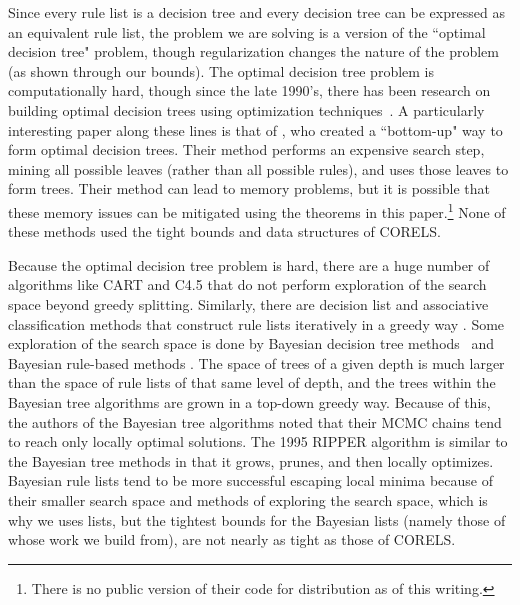 

Since every rule list is a decision tree and every decision tree can be expressed as an equivalent rule list, the problem we are solving is a version of the ``optimal decision tree" problem, though regularization changes the nature of the problem (as shown through our bounds). The optimal decision tree problem is computationally hard, though since the late 1990's, there has been research on building optimal decision trees using optimization techniques~\citep{Bennett96optimaldecision,dobkininduction,FarhangfarGZ08}. A particularly interesting paper along these lines is that of \citet{NijssenFromont2010}, who created a ``bottom-up" way to form optimal decision trees. Their method performs an expensive search step, mining all possible leaves (rather than all possible rules), and uses those leaves to form trees. Their method can lead to memory problems, but it is possible that these memory issues can be mitigated using the theorems in this paper.\footnote{There is no public version of their code for distribution as of this writing.} None of these methods used the tight bounds and data structures of CORELS.

Because the optimal decision tree problem is hard, there are a huge number of algorithms like CART \citep{Breiman84} and C4.5 \citep{Quinlan93} that do not perform exploration of the search space beyond greedy splitting. Similarly, there are decision list and associative classification methods that construct rule lists iteratively in a greedy way
\citep{Rivest87,Liu98,Li01,Yin03,Sokolova03,Marchand05,Vanhoof10,RudinLeMa13}.
Some exploration of the search space is done by Bayesian decision tree methods~\citep{Dension:1998hl,Chipman:2002hc,Chipman10} and Bayesian rule-based methods \citep{LethamRuMcMa15,YangRuSe16}. The space of trees of a given depth is much larger than the space of
rule lists of that same level of depth, and the trees within the Bayesian tree algorithms
are grown in a top-down greedy way. Because of this, the authors of the Bayesian tree algorithms noted that their MCMC chains tend to reach only locally optimal solutions. 
The 1995 RIPPER algorithm \citep{ripper} is similar to the Bayesian tree methods in that it grows, prunes, and then locally optimizes.
Bayesian rule lists tend to be more successful escaping local minima because of their smaller search space and methods of exploring the search space, which is why we uses lists, but the tightest bounds for the Bayesian lists (namely those of \citet{YangRuSe16} whose work we build from), are not nearly as tight as those of CORELS.

